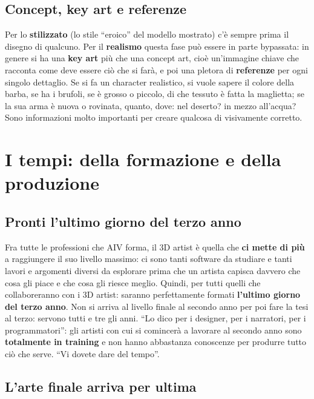 \subsection{Concept, key art e referenze}

Per lo \textbf{stilizzato} (lo stile ``eroico'' del modello mostrato) c'è
sempre prima il disegno di qualcuno. Per il \textbf{realismo} questa fase può
essere in parte bypassata: in genere si ha una \textbf{key art} più che una
concept art, cioè un'immagine chiave che racconta come deve essere ciò che si
farà, e poi una pletora di \textbf{referenze} per ogni singolo dettaglio. Se si
fa un character realistico, si vuole sapere il colore della barba, se ha i
brufoli, se è grosso o piccolo, di che tessuto è fatta la maglietta; se la sua
arma è nuova o rovinata, quanto, dove: nel deserto? in mezzo all'acqua? Sono
informazioni molto importanti per creare qualcosa di visivamente corretto.

\section{I tempi: della formazione e della produzione}
\label{p6:sec:tempi}

\subsection{Pronti l'ultimo giorno del terzo anno}

Fra tutte le professioni che AIV forma, il 3D artist è quella che \textbf{ci
mette di più} a raggiungere il suo livello massimo: ci sono tanti software da
studiare e tanti lavori e argomenti diversi da esplorare prima che un artista
capisca davvero che cosa gli piace e che cosa gli riesce meglio. Quindi, per
tutti quelli che collaboreranno con i 3D artist: saranno perfettamente formati
\textbf{l'ultimo giorno del terzo anno}. Non si arriva al livello finale al
secondo anno per poi fare la tesi al terzo: servono tutti e tre gli anni. ``Lo
dico per i designer, per i narratori, per i programmatori'': gli artisti con cui
si comincerà a lavorare al secondo anno sono \textbf{totalmente in training} e
non hanno abbastanza conoscenze per produrre tutto ciò che serve. ``Vi dovete
dare del tempo''.

\subsection{L'arte finale arriva per ultima}

